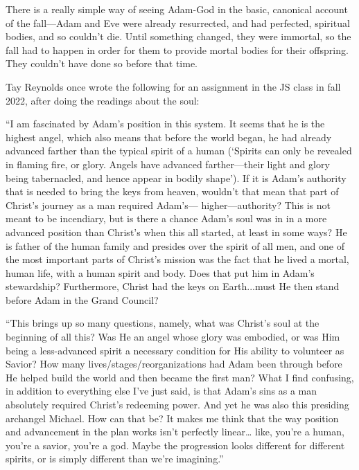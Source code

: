 		\begin{compactenum}
			\item There is a really simple way of seeing Adam-God in the basic, canonical account of the fall---Adam and Eve were already resurrected, and had perfected, spiritual bodies, and so couldn't die. Until something changed, they were immortal, so the fall had to happen in order for them to provide mortal bodies for their offspring. They couldn't have done so before that time.
			\item Tay Reynolds once wrote the following for an assignment in the JS class in fall 2022, after doing the readings about the soul:
				\begin{compactitem}
					\item ``I am fascinated by Adam's position in this system. It seems that he is the highest angel, which also means that before the world began, he had already advanced farther than the typical spirit of a human (`Spirits can only be revealed in flaming fire, or glory. Angels have advanced farther---their light and glory being tabernacled, and hence appear in bodily shape'). If it is Adam's authority that is needed to bring the keys from heaven, wouldn't that mean that part of Christ's journey as a man required Adam's--- higher---authority? This is not meant to be incendiary, but is there a chance Adam's soul was in in a more advanced position than Christ's when this all started, at least in some ways? He is father of the human family and presides over the spirit of all men, and one of the most important parts of Christ's mission was the fact that he lived a mortal, human life, with a human spirit and body. Does that put him in Adam's stewardship? Furthermore, Christ had the keys on Earth...must He then stand before Adam in the Grand Council?
					\item ``This brings up so many questions, namely, what was Christ's soul at the beginning of all this? Was He an angel whose glory was embodied, or was Him being a less-advanced spirit a necessary condition for His ability to volunteer as Savior? How many lives/stages/reorganizations had Adam been through before He helped build the world and then became the first man? What I find confusing, in addition to everything else I've just said, is that Adam's sins as a man absolutely required Christ's redeeming power. And yet he was also this presiding archangel Michael. How can that be? It makes me think that the way position and advancement in the plan works isn't perfectly linear… like, you're a human, you're a savior, you're a god. Maybe the progression looks different for different spirits, or is simply different than we're imagining.''
				\end{compactitem}
		\end{compactenum}